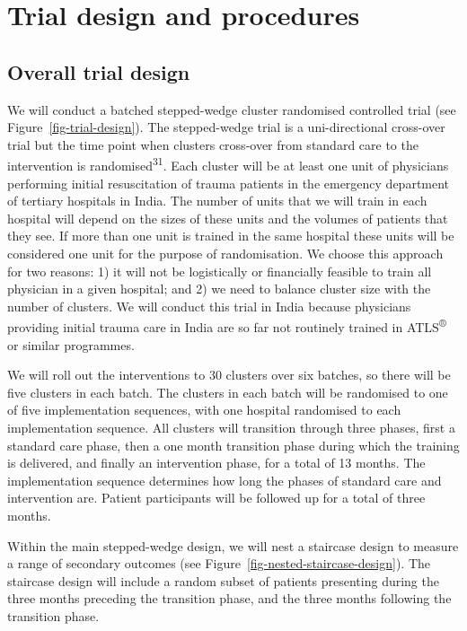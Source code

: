 \documentclass[
]{scrartcl}
\begin{document}
\hypertarget{trial-design-and-procedures}{%
\section{Trial design and
procedures}\label{trial-design-and-procedures}}

\hypertarget{overall-trial-design}{%
\subsection{Overall trial design}\label{overall-trial-design}}

We will conduct a batched stepped-wedge cluster randomised controlled
trial (see Figure~\ref{fig-trial-design}). The stepped-wedge trial is a
uni-directional cross-over trial but the time point when clusters
cross-over from standard care to the intervention is
randomised\textsuperscript{31}. Each cluster will be at least one unit
of physicians performing initial resuscitation of trauma patients in the
emergency department of tertiary hospitals in India. The number of units
that we will train in each hospital will depend on the sizes of these
units and the volumes of patients that they see. If more than one unit
is trained in the same hospital these units will be considered one unit
for the purpose of randomisation. We choose this approach for two
reasons: 1) it will not be logistically or financially feasible to train
all physician in a given hospital; and 2) we need to balance cluster
size with the number of clusters. We will conduct this trial in India
because physicians providing initial trauma care in India are so far not
routinely trained in ATLS\textsuperscript{®} or similar programmes.

We will roll out the interventions to 30 clusters over six batches, so
there will be five clusters in each batch. The clusters in each batch
will be randomised to one of five implementation sequences, with one
hospital randomised to each implementation sequence. All clusters will
transition through three phases, first a standard care phase, then a one
month transition phase during which the training is delivered, and
finally an intervention phase, for a total of 13 months. The
implementation sequence determines how long the phases of standard care
and intervention are. Patient participants will be followed up for a
total of three months.

Within the main stepped-wedge design, we will nest a staircase design to
measure a range of secondary outcomes (see
Figure~\ref{fig-nested-staircase-design}). The staircase design will
include a random subset of patients presenting during the three months
preceding the transition phase, and the three months following the
transition phase.
\end{document}
